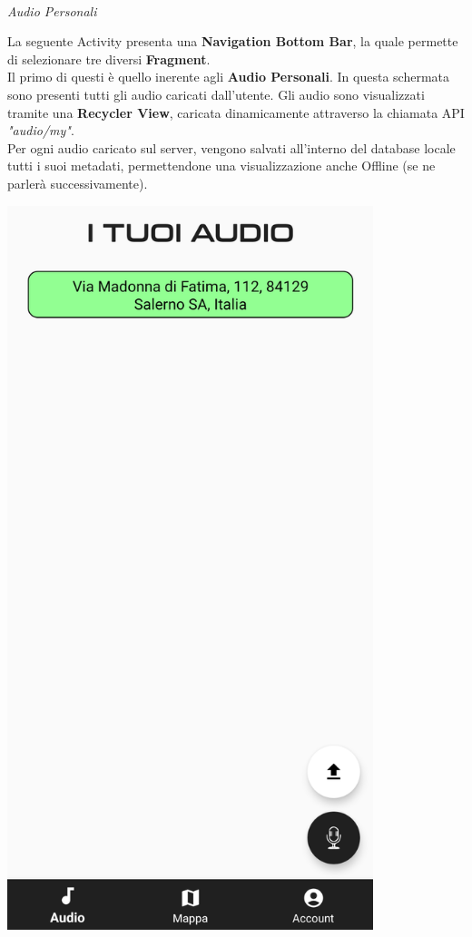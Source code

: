 \documentclass{article}
\begin{document}
\quad \vspace*{30pt}\\
\textit{Audio Personali}\\
\begin{minipage}[t]{0.6\textwidth}
    \raggedright
    \vspace*{10pt}
    La seguente Activity presenta una \textbf{Navigation Bottom Bar}, la quale permette di selezionare tre diversi \textbf{Fragment}.\vspace*{14pt}\\
    Il primo di questi è quello inerente agli \textbf{Audio Personali}. In questa schermata sono presenti tutti gli audio caricati dall'utente. Gli audio sono visualizzati tramite una \textbf{Recycler View}, caricata dinamicamente attraverso la chiamata API \textit{"audio/my"}.\\
    Per ogni audio caricato sul server, vengono salvati all'interno del database locale tutti i suoi metadati, permettendone una visualizzazione anche Offline (se ne parlerà successivamente).
\end{minipage}
\hfill
\begin{minipage}[t]{0.35\textwidth}
    \centering
    \vspace*{0pt}
    \includegraphics[width=0.8\textwidth]{audiopersonali.png}\vspace*{40pt}
\end{minipage}
\end{document}
